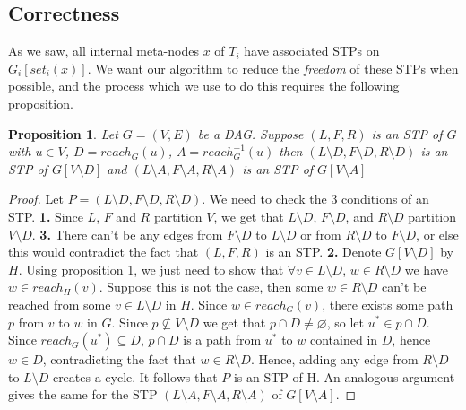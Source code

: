\documentclass{article}
\newtheorem{proposition}{Proposition}
\begin{document}
\subsection{Correctness}

As we saw, all internal meta-nodes $x$ of $T_{i}$ have associated STPs on $G_{i}[set_{i}(x)]$. We want our algorithm to reduce the \textit{freedom} of these STPs when possible, and the process which we use to do this requires the following proposition.

\begin{proposition}
Let $G=(V,E)$ be a DAG. Suppose $(L,F,R)$ is an STP of $G$ with $u \in V$, $D=reach_{G}(u)$, $A=reach_{G}^{-1}(u)$ then $(L\setminus D,F\setminus D,R\setminus D)$ is an STP of $G[V\setminus D]$ and $(L\setminus A,F\setminus A,R\setminus A)$ is an STP of $G[V\setminus A]$
\end{proposition}

\begin{proof}
Let $P=(L\setminus D,F\setminus D,R\setminus D)$. We need to check the 3 conditions of an STP. \textbf{1.} Since $L$, $F$ and $R$ partition $V$, we get that $L\setminus D$, $F\setminus D$, and $R\setminus D$ partition $V\setminus D$. \textbf{3.} There can't be any edges from $F\setminus D$ to $L\setminus D$ or from $R\setminus D$ to $F\setminus D$, or else this would contradict the fact that $(L,F,R)$ is an STP. \textbf{2.} Denote $G[V\setminus D]$ by $H$. Using proposition 1, we just need to show that $\forall v \in L \setminus D$, $w \in R \setminus D$ we have $w \in reach_{H}(v)$. Suppose this is not the case, then some $w \in R \setminus D$ can't be reached from some $v \in L \setminus D$ in $H$. Since $w \in reach_{G}(v)$, there exists some path $p$ from $v$ to $w$ in $G$. Since $p \nsubseteq V \setminus D$ we get that $p \cap D \neq \varnothing$, so let $u^{*} \in p \cap D$. Since $reach_{G}(u^{*}) \subseteq D$, $p \cap D$ is a path from $u^{*}$ to $w$ contained in $D$, hence $w \in D$, contradicting the fact that $w \in R \setminus D$. Hence, adding any edge from $R \setminus D$ to $L \setminus D$ creates a cycle. It follows that $P$ is an STP of H. An analogous argument gives the same for the STP $(L\setminus A,F\setminus A,R\setminus A)$ of $G[V\setminus A]$.
\end{proof}
\end{document}
